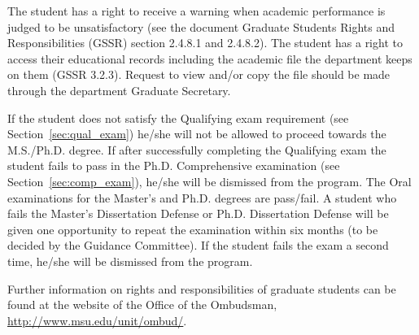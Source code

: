 The student has a right to receive a warning when academic performance
is judged to be unsatisfactory (see the document Graduate Students
Rights and Responsibilities (GSSR) section 2.4.8.1 and 2.4.8.2).  The
student has a right to access their educational records including the
academic file the department keeps on them (GSSR 3.2.3).  Request to
view and/or copy the file should be made through the department
Graduate Secretary.

If the student does not satisfy the Qualifying exam requirement (see
Section~\ref{sec:qual_exam}) he/she will not be allowed to proceed
towards the M.S./Ph.D. degree.  If after successfully completing the
Qualifying exam the student fails to pass in the Ph.D. Comprehensive
examination (see Section~\ref{sec:comp_exam}), he/she will be
dismissed from the program.  The Oral examinations for the Master's
and Ph.D. degrees are pass/fail.  A student who fails the Master's
Dissertation Defense or Ph.D. Dissertation Defense will be given one
opportunity to repeat the examination within six months (to be decided
by the Guidance Committee).  If the student fails the exam a second
time, he/she will be dismissed from the program.


Further information on rights and responsibilities of graduate
students can be found at the website of the Office of the Ombudsman,
\url{http://www.msu.edu/unit/ombud/}.

 
